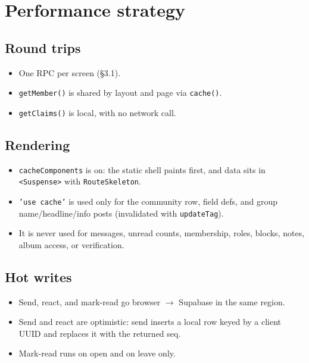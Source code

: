 \documentclass[11pt,a4paper]{article}
\newcommand{\code}[1]{\texttt{\small #1}}
\begin{document}
\section{Performance strategy}
\subsection{Round trips}
\begin{itemize}
  \item One RPC per screen (\S3.1).
  \item \code{getMember()} is shared by layout and page via \code{cache()}.
  \item \code{getClaims()} is local, with no network call.
\end{itemize}

\subsection{Rendering}
\begin{itemize}
  \item \code{cacheComponents} is on: the static shell paints first, and data sits in \code{<Suspense>} with
        \code{RouteSkeleton}.
  \item \code{'use cache'} is used only for the community row, field defs, and group name/headline/info posts
        (invalidated with \code{updateTag}).
  \item It is never used for messages, unread counts, membership, roles, blocks, notes, album access, or verification.
\end{itemize}

\subsection{Hot writes}
\begin{itemize}
  \item Send, react, and mark-read go browser $\rightarrow$ Supabase in the same region.
  \item Send and react are optimistic: send inserts a local row keyed by a client UUID and replaces it with the
        returned seq.
  \item Mark-read runs on open and on leave only.
\end{itemize}
\end{document}
